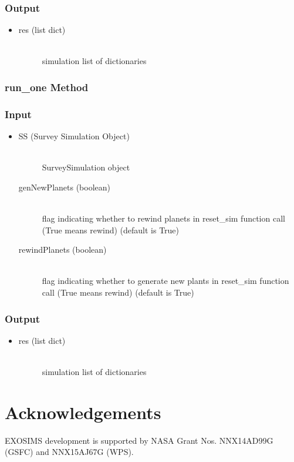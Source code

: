 \documentclass[cleanfoot]{asme2ej}
\begin{document}
\subsubsection*{Output}
\begin{itemize}
\item
\begin{description}
    \item[res (list dict)] \hfill \\ simulation list of dictionaries
\end{description}
\end{itemize}

\subsubsection{run\_one Method} 

\subsubsection*{Input}
\begin{itemize}
\item
\begin{description}
    \item[SS (Survey Simulation Object)] \hfill \\ SurveySimulation object
    \item[genNewPlanets (boolean)] \hfill \\ flag indicating whether to rewind planets in reset\_sim function call (True means rewind) (default is True)
    \item[rewindPlanets (boolean)] \hfill \\ flag indicating whether to generate new plants in reset\_sim function  call (True means rewind) (default is True)
\end{description}
\end{itemize}
\subsubsection*{Output}
\begin{itemize}
\item
\begin{description}
    \item[res (list dict)] \hfill \\ simulation list of dictionaries
\end{description}
\end{itemize}

\section*{Acknowledgements}  EXOSIMS development is supported by NASA Grant Nos. NNX14AD99G (GSFC) and NNX15AJ67G (WPS).
\end{document}
